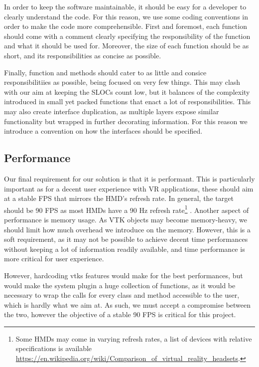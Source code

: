 In order to keep the software maintainable, it should be easy for a developer to clearly understand the code. For this reason, we use some coding conventions in order to make the code more comprehensible. First and foremost, each function should come with a comment clearly specifying the responsibility of the function and what it should be used for. Moreover, the size of each function should be as short, and its responsibilities as concise as possible.

Finally, function and methods should cater to as little and consice responsibilitiies as possible, being focused on very few things. This may clash with our aim at keeping the SLOCs count low, but it balances of the complexity introduced in small yet packed functions that enact a lot of responsibilities. This may also create interface duplication, as multiple layers expose similar functionality but wrapped in further decorating information. For this reason we introduce a convention on how the interfaces should be specified.

\subsection{Performance}

Our final requirement for our solution is that it is performant. This is particularly important as for a decent user experience with VR applications, these should aim at a stable FPS that mirrors the HMD's refresh rate. In general, the target should be 90 FPS as most HMDs have a 90 Hz refresh rate\footnote{Some HMDs may come in varying refresh rates, a list of devices with relative specifications is available \url{https://en.wikipedia.org/wiki/Comparison_of_virtual_reality_headsets}.} \cite{unity_vr_2020}. Another aspect of performance is memory usage. As VTK objects may become memory-heavy, we should limit how much overhead we introduce on the memory. However, this is a soft requirement, as it may not be possible to achieve decent time performances without keeping a lot of information readily available, and time performance is more critical for user experience.

However, hardcoding \acrshort{vtk}s features would make for the best performances, but would make the system plugin a huge collection of functions, as it would be necessary to wrap the calls for every class and method accessible to the user, which is hardly what we aim at. As such, we must accept a compromise between the two, however the objective of a stable 90 FPS is critical for this project.

